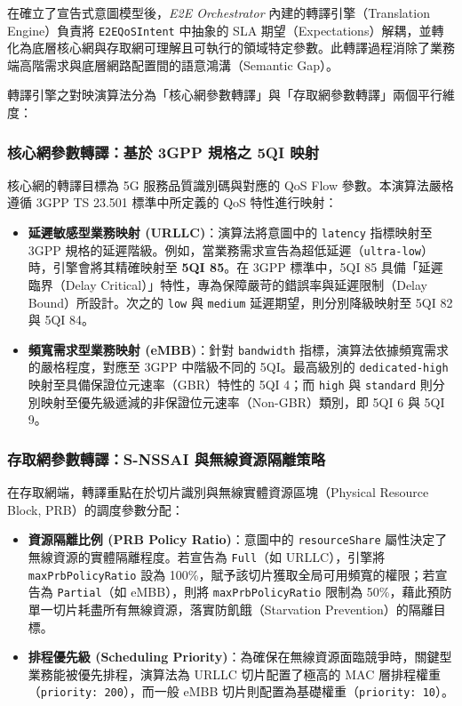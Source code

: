 在確立了宣告式意圖模型後，\textit{E2E Orchestrator} 內建的轉譯引擎（Translation Engine）負責將 \texttt{E2EQoSIntent} 中抽象的 SLA 期望（Expectations）解耦，並轉化為底層核心網與存取網可理解且可執行的領域特定參數。此轉譯過程消除了業務端高階需求與底層網路配置間的語意鴻溝（Semantic Gap）。

轉譯引擎之對映演算法分為「核心網參數轉譯」與「存取網參數轉譯」兩個平行維度：

\subsubsection{核心網參數轉譯：基於 3GPP 規格之 5QI 映射}
核心網的轉譯目標為 5G 服務品質識別碼與對應的 QoS Flow 參數。本演算法嚴格遵循 3GPP TS 23.501 標準中所定義的 QoS 特性進行映射：
\begin{itemize}
    \item \textbf{延遲敏感型業務映射 (URLLC)}：演算法將意圖中的 \texttt{latency} 指標映射至 3GPP 規格的延遲階級。例如，當業務需求宣告為超低延遲（\texttt{ultra-low}）時，引擎會將其精確映射至 \textbf{5QI 85}。在 3GPP 標準中，5QI 85 具備「延遲臨界（Delay Critical）」特性，專為保障嚴苛的錯誤率與延遲限制（Delay Bound）所設計。次之的 \texttt{low} 與 \texttt{medium} 延遲期望，則分別降級映射至 5QI 82 與 5QI 84。
    \item \textbf{頻寬需求型業務映射 (eMBB)}：針對 \texttt{bandwidth} 指標，演算法依據頻寬需求的嚴格程度，對應至 3GPP 中階級不同的 5QI。最高級別的 \texttt{dedicated-high} 映射至具備保證位元速率（GBR）特性的 5QI 4；而 \texttt{high} 與 \texttt{standard} 則分別映射至優先級遞減的非保證位元速率（Non-GBR）類別，即 5QI 6 與 5QI 9。
\end{itemize}

\subsubsection{存取網參數轉譯：S-NSSAI 與無線資源隔離策略}
在存取網端，轉譯重點在於切片識別與無線實體資源區塊（Physical Resource Block, PRB）的調度參數分配：
\begin{itemize}
    \item \textbf{資源隔離比例 (PRB Policy Ratio)}：意圖中的 \texttt{resourceShare} 屬性決定了無線資源的實體隔離程度。若宣告為 \texttt{Full}（如 URLLC），引擎將 \texttt{maxPrbPolicyRatio} 設為 100\%，賦予該切片獲取全局可用頻寬的權限；若宣告為 \texttt{Partial}（如 eMBB），則將 \texttt{maxPrbPolicyRatio} 限制為 50\%，藉此預防單一切片耗盡所有無線資源，落實防飢餓（Starvation Prevention）的隔離目標。
    \item \textbf{排程優先級 (Scheduling Priority)}：為確保在無線資源面臨競爭時，關鍵型業務能被優先排程，演算法為 URLLC 切片配置了極高的 MAC 層排程權重（\texttt{priority: 200}），而一般 eMBB 切片則配置為基礎權重（\texttt{priority: 10}）。
\end{itemize}

